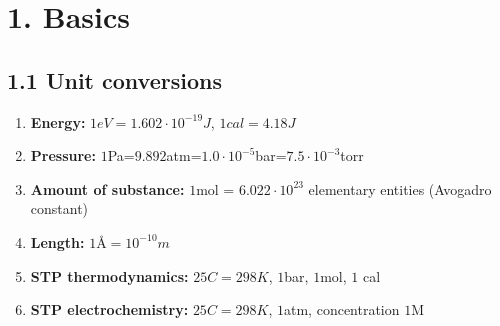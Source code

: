 \documentclass{cheatsheet}
\author{Noa Sendlhofer \& Cristian Leser \\ nsendlhofer \& cleser}
\begin{document}
\section{1. Basics}
    \subsection{1.1 Unit conversions}
		\begin{enumerate}
    		\item \textbf{Energy:} $1eV=1.602\cdot 10^{-19}J$,    $1cal=4.18J$
    		\item \textbf{Pressure:} $1$Pa=$9.892$atm=$1.0\cdot 10^{-5}$bar=$7.5\cdot 10^{-3}$torr
    		\item \textbf{Amount of substance:} $1$mol = $6.022\cdot 10^{23}$ elementary entities (Avogadro constant)
    		\item \textbf{Length:} $1\text{Å}=10^{-10}m$
    		\item \textbf{STP thermodynamics: } $25C=298K$,  $1$bar,  $1$mol, $1$ cal
    		\item \textbf{STP electrochemistry: } $25C=298K$,  $1$atm, concentration $1$M
		\end{enumerate}
	
	
\end{document}
